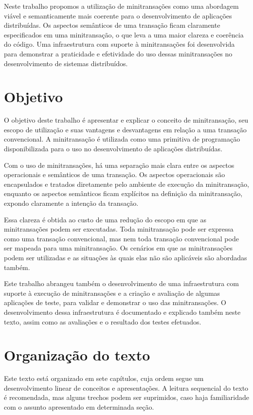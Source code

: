 \documentclass[11pt,twoside,a4paper]{book}
\begin{document}
Neste trabalho propomos a utilização de minitransações como uma abordagem viável e semanticamente mais coerente para o desenvolvimento de aplicações distribuídas. Os aspectos semânticos de uma transação ficam claramente especificados em uma minitransação, o que leva a uma maior clareza e coerência do código. Uma infraestrutura com suporte à minitransações foi desenvolvida para demonstrar a praticidade e efetividade do uso dessas minitransações no desenvolvimento de sistemas distribuídos.

\section{Objetivo}
\label{sec:objetivo}
O objetivo deste trabalho é apresentar e explicar o conceito de minitransação, seu escopo de utilização e suas vantagens e desvantagens em relação a uma transação convencional. A minitransação é utilizada como uma primitiva de programação disponibilizada para o uso no desenvolvimento de aplicações distribuídas. 

Com o uso de minitransações, há uma separação mais clara entre os aspectos operacionais e semânticos de uma transação. Os aspectos operacionais são encapsulados e tratados diretamente pelo ambiente de execução da minitransação, enquanto os aspectos semânticos ficam explícitos na definição da minitransação, expondo claramente a intenção da transação.

Essa clareza é obtida ao custo de uma redução do escopo em que as minitransações podem ser executadas. Toda minitransação pode ser expressa como uma transação convencional, mas nem toda transação convencional pode ser mapeada para uma minitransação. Os cenários em que as minitransações podem ser utilizadas e as situações às quais elas não são aplicáveis são abordadas também.

Este trabalho abrangeu também o desenvolvimento de uma infraestrutura com suporte à execução de minitransações e a criação e avaliação de algumas aplicações de teste, para validar e demonstrar o uso das minitransações. O desenvolvimento dessa infraestrutura é documentado e explicado também neste texto, assim como as avaliações e o resultado dos testes efetuados.

\section{Organização do texto}
\label{sec:organizacao_do_texto}
Este texto está organizado em sete capítulos, cuja ordem segue um desenvolvimento linear de conceitos e apresentações. A leitura sequencial do texto é recomendada, mas alguns trechos podem ser suprimidos, caso haja familiaridade com o assunto apresentado em determinada seção.
\end{document}
